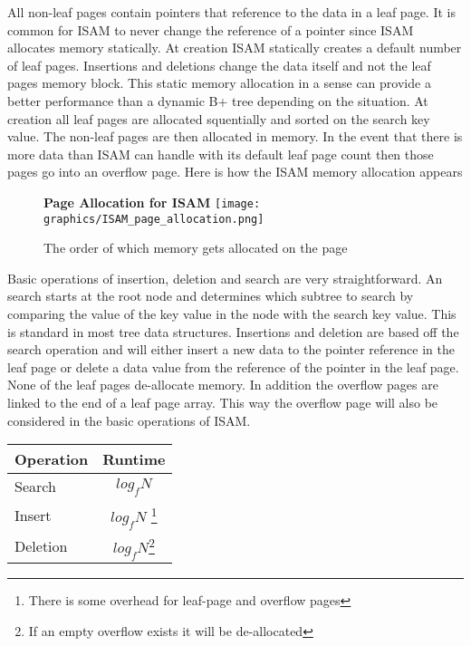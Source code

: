 \documentclass[letterpaper, 12pt]{article}
\begin{document}
All non-leaf pages contain pointers that reference to the data in a leaf page. It is common for
ISAM to never change the reference of a pointer since ISAM allocates memory statically. At creation
ISAM statically creates a default number of leaf pages. Insertions and deletions change the data
itself and not the leaf pages memory block. This static memory allocation in a sense can
provide a better performance than a dynamic B+ tree depending on the situation. At creation all
leaf pages are allocated squentially and sorted on the search key value. The non-leaf pages
are then allocated in memory. In the event that there is more data than ISAM can handle with its
default leaf page count then those pages go into an overflow page. Here is how the ISAM memory
allocation appears
\par\vspace{\baselineskip}

\begin{figure}
  \centering
  \textbf{Page Allocation for ISAM}
  \texttt{[image: graphics/ISAM\_page\_allocation.png]}
  \caption{The order of which memory gets allocated on the page}
\end{figure}

Basic operations of insertion, deletion and search are very straightforward. An search starts at the
root node and determines which subtree to search by comparing the value of the key value in the node
with the search key value. This is standard in most tree data structures. Insertions and deletion are
based off the search operation and will either insert a new data to the pointer reference in the leaf
page or delete a data value from the reference of the pointer in the leaf page. None of the leaf
pages de-allocate memory. In addition the overflow pages are linked to the end of a leaf page array.
This way the overflow page will also be considered in the basic operations of ISAM.
\par\vspace{\baselineskip}

\begin{center}
\begin{tabular}{l | c}
  \hline
  Operation & Runtime \\ \hline \hline
  Search & $ log_f N $ \\ \hline
  Insert & $ log_f N $ \footnote{There is some overhead for leaf-page and overflow pages} \\ \hline
  Deletion & $ log_f N $\footnote{If an empty overflow exists it will be de-allocated} \\ \hline
\end{tabular}
\end{center}
\end{document}
